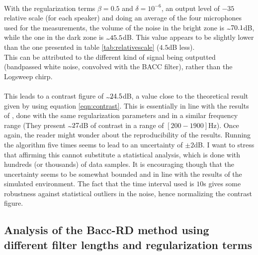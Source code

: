 \\
With the regularization terms $\beta = 0.5$ and $\delta = 10^{-6}$, an output level of $-35$ relative scale (for each speaker) and doing an average of the four microphones used for the measurements, the volume of the noise in the bright zone is $\tld 70.1$dB, while the one in the dark zone is $\tld 45.5$dB. This value appears to be slightly lower than the one presented in table \ref{tab:relativescale} ($4.5$dB less).
\\
This can be attributed to the different kind of signal being outputted (bandpassed white noise, convolved with the BACC filter), rather than the Logsweep chirp.
\\
\\
This leads to a contrast figure of $\tld 24.5$dB, a value close to the theoretical result given by using equation \ref{eqn:contrast}. This is essentially in line with the results of \parencite{cai_time-domain_2014}, done with the same regularization parameters and in a similar frequency range (They present $\tld 27$dB of contrast in a range of $[200-1900]$Hz). Once again, the reader might wonder about the reproducibility of the results. Running the algorithm five times seems to lead to an uncertainty of $\pm 2$dB. I want to stress that affirming this cannot substitute a statistical analysis, which is done with hundreds (or thousands) of data samples. It is encouraging though that the uncertainty seems to be somewhat bounded and in line with the results of the simulated environment. The fact that the time interval used is $10$s gives some robustness against statistical outliers in the noise, hence normalizing the contrast figure.

\subsection{Analysis of the Bacc-RD method using different filter lengths and regularization terms}{}
\label{subsec:baccvary}

